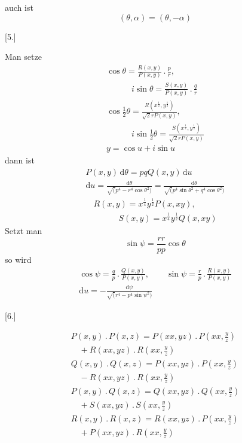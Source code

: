 \providecommand{\GaussCircleArrow}{\ensuremath{\mathord{\vcenter{\hbox{\setlength{\unitlength}{1pt}\begin{picture}(10,11)\linethickness{.55pt}\put(3.3,3.3){\circle{5.2}}\put(5.1,5.1){\line(1,1){3.2}}\put(5.6,8.3){\line(1,0){2.7}}\put(8.3,5.6){\line(0,1){2.7}}\end{picture}}}}}}
auch ist
\[
(\theta,\alpha)=(\theta,-\alpha)
\]
\par\medskip{}\centerline{[5.]}\nobreak\smallskip
Man setze
\[
\begin{gathered}
\cos\theta=\frac{R(x,y)}{P(x,y)}\,.\,\frac{p}{r},
\\[8pt]\quad{}\qquad i\sin\theta=\frac{S(x,y)}{P(x,y)}\,.\,\frac{q}{r}
\\[8pt]
\cos\tfrac12\theta=\frac{R(x^{\frac12},y^{\frac12})}{\surd 2rP(x,y)},
\\[8pt]\quad{}\qquad i\sin\tfrac12\theta=\frac{S(x^{\frac12},y^{\frac12})}{\surd 2rP(x,y)}
\\[8pt]
y=\cos u+i\sin u
\end{gathered}
\]
dann ist
\[
\begin{gathered}
P(x,y)\,\mathrm{d}\theta=pqQ(x,y)\,\mathrm{d}u
\\[8pt]
\mathrm{d}u=\frac{\mathrm{d}\theta}{\surd(p^4-r^4\cos\theta^2)}
=\frac{\mathrm{d}\theta}{\surd(p^4\sin\theta^2+q^4\cos\theta^2)}
\end{gathered}
\]
\[
\begin{gathered}R(x,y)=x^{\frac14}y^{\frac12}P(x,xy),
\\[8pt]\quad{}\qquad S(x,y)=x^{\frac14}y^{\frac12}Q(x,xy)\end{gathered}
\]
Setzt man
\[
\sin\psi=\frac{rr}{pp}\cos\theta
\]
so wird
\[
\begin{gathered}
\cos\psi=\frac{q}{p}\,.\,\frac{Q(x,y)}{P(x,y)},
\qquad \sin\psi=\frac{r}{p}\,.\,\frac{R(x,y)}{P(x,y)}
\\[8pt]
\mathrm{d}u=-\frac{\mathrm{d}\psi}{\surd(r^4-p^4\sin\psi^2)}
\end{gathered}
\]
\par\medskip{}\centerline{[6.]}\nobreak\smallskip
\[
\begin{gathered}
P(x,y)\,.\,P(x,z)=P(xx,yz)\,.\,P(xx,\tfrac{y}{z})\\[8pt]\quad{}+R(xx,yz)\,.\,R(xx,\tfrac{y}{z})\\[8pt]
Q(x,y)\,.\,Q(x,z)=P(xx,yz)\,.\,P(xx,\tfrac{y}{z})\\[8pt]\quad{}-R(xx,yz)\,.\,R(xx,\tfrac{y}{z})\\[8pt]
P(x,y)\,.\,Q(x,z)=Q(xx,yz)\,.\,Q(xx,\tfrac{y}{z})\\[8pt]\quad{}+S(xx,yz)\,.\,S(xx,\tfrac{y}{z})\\[8pt]
R(x,y)\,.\,R(x,z)=R(xx,yz)\,.\,P(xx,\tfrac{y}{z})\\[8pt]\quad{}+P(xx,yz)\,.\,R(xx,\tfrac{y}{z})
\end{gathered}
\]
